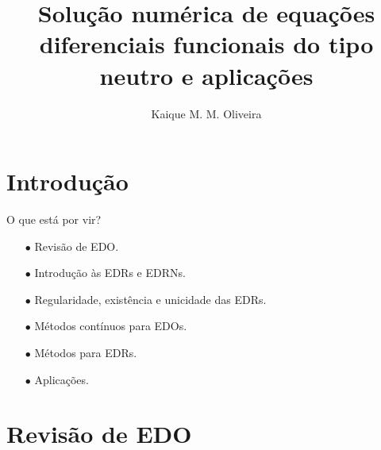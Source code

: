 \documentclass{beamer}
\title{Solução numérica de equações diferenciais funcionais do tipo neutro e aplicações}
\author[Kaique Oliveira]{Kaique M. M. Oliveira}
\theoremstyle{plain}
\theoremstyle{definition}
\begin{document}
\typesetFrontSlides







\section{Introdução}

\begin{frame}{O que está por vir?}

    \begin{itemize}
        \item[$\bullet$] Revisão de EDO.
        \item[$\bullet$] Introdução às EDRs e EDRNs.
        \item[$\bullet$] Regularidade, existência e unicidade das EDRs.
        \item[$\bullet$] Métodos contínuos para EDOs.
        \item[$\bullet$] Métodos para EDRs.
        \item[$\bullet$] Aplicações.
    \end{itemize}
\end{frame}


\section{Revisão de EDO}
\end{document}

